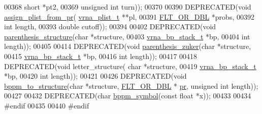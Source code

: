 \begin{DoxyCode}
00368                                       \textcolor{keywordtype}{short} *pt2,
00369                                       \textcolor{keywordtype}{unsigned} \textcolor{keywordtype}{int} turn));
00370 
00390 DEPRECATED(\textcolor{keywordtype}{void}  \hyperlink{group__pf__fold_gacfdacc119b749bccf939de445afea07b}{assign\_plist\_from\_pr}( \hyperlink{group__data__structures_structvrna__plist__s}{vrna\_plist\_t} **pl,
00391                             \hyperlink{group__data__structures_ga31125aeace516926bf7f251f759b6126}{FLT\_OR\_DBL} *probs,
00392                             \textcolor{keywordtype}{int} length,
00393                             \textcolor{keywordtype}{double} cutoff));
00394 
00402 DEPRECATED(\textcolor{keywordtype}{void} \hyperlink{group__struct__utils_gadf0ad2d46c9ca7b850437d1b79627a7e}{parenthesis\_structure}(\textcolor{keywordtype}{char} *structure,
00403                                       \hyperlink{group__data__structures_structvrna__bp__stack__s}{vrna\_bp\_stack\_t} *bp,
00404                                       \textcolor{keywordtype}{int} length));
00405 
00414 DEPRECATED(\textcolor{keywordtype}{void} \hyperlink{group__struct__utils_gab9c5c8311bd5120900585d4fa50c2df0}{parenthesis\_zuker}(\textcolor{keywordtype}{char} *structure,
00415                                   \hyperlink{group__data__structures_structvrna__bp__stack__s}{vrna\_bp\_stack\_t} *bp,
00416                                   \textcolor{keywordtype}{int} length));
00417 
00418 DEPRECATED(\textcolor{keywordtype}{void} letter\_structure( \textcolor{keywordtype}{char} *structure,
00419                                   \hyperlink{group__data__structures_structvrna__bp__stack__s}{vrna\_bp\_stack\_t} *bp,
00420                                   \textcolor{keywordtype}{int} length));
00421 
00426 DEPRECATED(\textcolor{keywordtype}{void}  \hyperlink{group__struct__utils_ga129d81c4a1ead793c5b2311333e03dfa}{bppm\_to\_structure}(\textcolor{keywordtype}{char} *structure, \hyperlink{group__data__structures_ga31125aeace516926bf7f251f759b6126}{FLT\_OR\_DBL} *
      \hyperlink{fold__vars_8h_ac98ec419070aee6831b44e5c700f090f}{pr}, \textcolor{keywordtype}{unsigned} \textcolor{keywordtype}{int} length));
00427 
00432 DEPRECATED(\textcolor{keywordtype}{char}    \hyperlink{group__struct__utils_ga49962ad6242b8c628de6ca16bb831c1d}{bppm\_symbol}(\textcolor{keyword}{const} \textcolor{keywordtype}{float} *x));
00433 
00434 \textcolor{preprocessor}{#endif}
00435 
00440 \textcolor{preprocessor}{#endif}
\end{DoxyCode}
